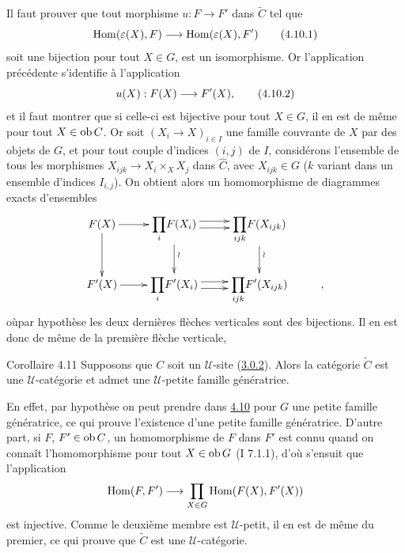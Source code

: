\documentclass[10pt]{../fichiers-configuration-latex/smfart}
\begin{document}
Il faut prouver que tout morphisme $u:F\rightarrow F'$ dans
$\widetilde{C}$ tel que
\begin{equation}
\operatorname{Hom}(\varepsilon(X),F)\longrightarrow \operatorname{Hom}(\varepsilon(X),F')\tag{4.10.1}
\end{equation}
soit une bijection pour tout $X\in G$, est un isomorphisme. Or
l'application précédente s'identifie à l'application
\begin{equation}
u(X):F(X)\longrightarrow F'(X){},\tag{4.10.2}
\end{equation}
et il faut montrer que si celle-ci est bijective pour tout $X\in G$,
il en est de même pour tout $X\in \operatorname{ob} C$. Or soit $(X_i\rightarrow
X)_{i\in I}$ une famille couvrante de $X$ par des objets de $G$, et
pour tout couple d'indices $(i,j)$ de $I$, considérons l'ensemble
de tous les morphismes $X_{ijk}\rightarrow X_i\times_XX_j$ dans
$\widehat{C}$, avec $X_{ijk}\in G$ ($k$ variant dans un ensemble
d'indices $I_{i,j}$). On obtient alors un homomorphisme de
diagrammes exacts d'ensembles
\[
\xymatrix{ F(X) \ar[r] \ar[d]& \displaystyle{{\prod_i}} F(X_i)
\ar[d]^{\wr} \ar@<3pt>[r] \ar@<-3pt>[r] & \displaystyle{\prod_{ijk}}
F(X_{ijk}) \ar[d]^{\wr}\\
F'(X) \ar[r] & \displaystyle{{\prod_i}} F'(X_i) \ar@<3pt>[r]
\ar@<-3pt>[r] & \displaystyle{\prod_{ijk}} F'(X_{ijk})&, }
\]
où\pageoriginale par hypothèse les deux dernières flèches
verticales sont des bijections. Il en est donc de même de la
première flèche verticale, \cqfd

\begin{enonce*}{Corollaire 4.11}
Supposons que $C$ soit un $𝒰$-site (\hyperref[II.def3.0.2]{3.0.2}).
Alors la catégorie $\widetilde{C}$ est une $𝒰$-catégorie
et admet une $𝒰$-petite famille génératrice.
\end{enonce*}

En effet, par hypothèse on peut prendre dans \hyperref[II.prop4.10]{4.10} pour
$G$ une petite famille génératrice, ce qui prouve l'existence d'une
petite famille génératrice. D'autre part, si $F$, $F'\in \operatorname{ob} C$, un
homomorphisme de $F$ dans $F'$ est connu quand on connaît
l'homomorphisme  \ie {} pour tout
$X\in \operatorname{ob} G$ (I 7.1.1), d'où s'ensuit que l'application
$$
\operatorname{Hom}(F,F')\longrightarrow \prod_{X\in G} \operatorname{Hom}(F(X),F'(X))
$$
est injective. Comme le deuxième membre est $𝒰$-petit, il en
est de même du premier, ce qui prouve que $\widetilde{C}$ est une
$𝒰$-catégorie.
\end{document}
